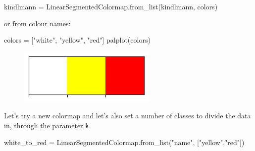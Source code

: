 \documentclass[
  letterpaper,
  DIV=11,
  numbers=noendperiod]{scrreprt}
\newenvironment{Shaded}{\begin{snugshade}}{\end{snugshade}}
\newcommand{\NormalTok}[1]{\textcolor[rgb]{0.00,0.23,0.31}{#1}}
\newcommand{\OperatorTok}[1]{\textcolor[rgb]{0.37,0.37,0.37}{#1}}
\newcommand{\StringTok}[1]{\textcolor[rgb]{0.13,0.47,0.30}{#1}}
\begin{document}
\begin{Shaded}
\begin{Highlighting}[]
\NormalTok{kindlmann }\OperatorTok{=}\NormalTok{ LinearSegmentedColormap.from\_list(}\StringTok{\textquotesingle{}kindlmann\textquotesingle{}}\NormalTok{, colors)}
\end{Highlighting}
\end{Shaded}

or from colour names:

\begin{Shaded}
\begin{Highlighting}[]
\NormalTok{colors }\OperatorTok{=}\NormalTok{ [}\StringTok{"white"}\NormalTok{, }\StringTok{"yellow"}\NormalTok{, }\StringTok{"red"}\NormalTok{]}
\NormalTok{palplot(colors)}
\end{Highlighting}
\end{Shaded}

\begin{figure}[H]

{\centering \includegraphics{labs/w02_maps_files/figure-pdf/cell-31-output-1.png}

}

\end{figure}

Let's try a new colormap and let's also set a number of classes to
divide the data in, through the parameter \texttt{k}.

\begin{Shaded}
\begin{Highlighting}[]
\NormalTok{white\_to\_red }\OperatorTok{=}\NormalTok{ LinearSegmentedColormap.from\_list(}\StringTok{"name"}\NormalTok{, [}\StringTok{"yellow"}\NormalTok{,}\StringTok{"red"}\NormalTok{])}
\end{Highlighting}
\end{Shaded}
\end{document}
